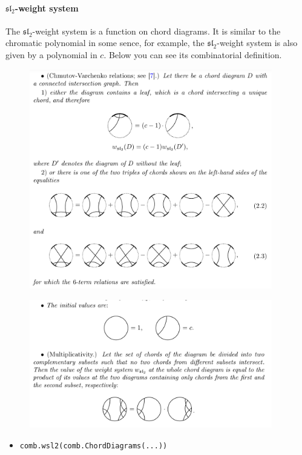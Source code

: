 \documentclass[11pt]{article}
\providecommand{\tightlist}{%
      \setlength{\itemsep}{0pt}\setlength{\parskip}{0pt}}
\begin{document}
    \paragraph{\texorpdfstring{\(\mathfrak{sl}_2\)-weight
system}{\textbackslash mathfrak\{sl\}\_2-weight system}}\label{mathfraksl_2-weight-system}

    The \(\mathfrak{sl}_2\)-weight system is a function on chord diagrams.
It is similar to the chromatic polynomial in some sence, for example,
the \(\mathfrak{sl}_2\)-weight system is also given by a polynomial in
\(c\). Below you can see its combinatorial definition.

\begin{figure}
    \center
    \includegraphics[width=300pt]{pic/def1.png}
\end{figure}    
\begin{figure}
    \center
    \includegraphics[width=300pt]{pic/def2.png}
\end{figure}    
    

    \begin{itemize}
\tightlist
\item
  \texttt{comb.wsl2(comb.ChordDiagrams(...))}
\end{itemize}
\end{document}
